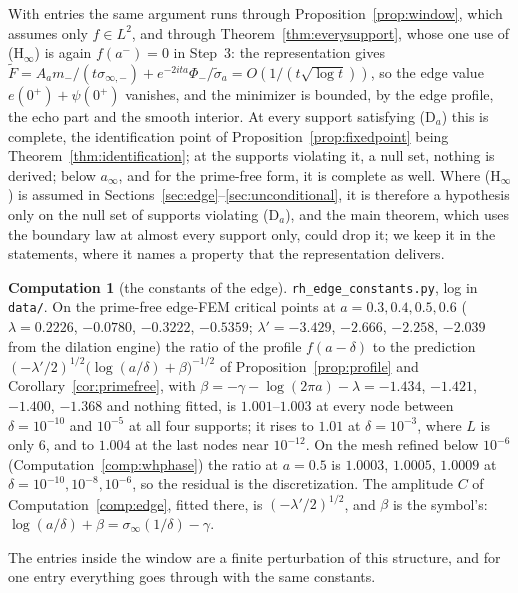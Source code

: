 \documentclass[11pt]{article}
\theoremstyle{definition}
\newtheorem{computation}[theorem]{Computation}
\theoremstyle{remark}
\begin{document}
With entries the same argument runs through Proposition~\ref{prop:window}, which assumes only $f\in L^2$, and through Theorem~\ref{thm:everysupport}, whose one use of (H$_\infty$) is again $f(a^-)=0$ in Step~3: the representation gives $\tilde F=A_am_-/(t\sigma_{\infty,-})+e^{-2ita}\Phi_-/\tilde\sigma_a=O(1/(t\sqrt{\log t}))$, so the edge value $e(0^+)+\psi(0^+)$ vanishes, and the minimizer is bounded, by the edge profile, the echo part and the smooth interior. At every support satisfying (D$_a$) this is complete, the identification point of Proposition~\ref{prop:fixedpoint} being Theorem~\ref{thm:identification}; at the supports violating it, a null set, nothing is derived; below $a_\infty$, and for the prime-free form, it is complete as well. Where (H$_\infty$) is assumed in Sections~\ref{sec:edge}--\ref{sec:unconditional}, it is therefore a hypothesis only on the null set of supports violating (D$_a$), and the main theorem, which uses the boundary law at almost every support only, could drop it; we keep it in the statements, where it names a property that the representation delivers.


\begin{computation}[the constants of the edge]\label{comp:edgeconst}
\texttt{rh\_edge\_constants.py}, log in \texttt{data/}. On the prime-free edge-FEM critical points at $a=0.3,0.4,0.5,0.6$ ($\lambda=0.2226$, $-0.0780$, $-0.3222$, $-0.5359$; $\lambda'=-3.429$, $-2.666$, $-2.258$, $-2.039$ from the dilation engine) the ratio of the profile $f(a-\delta)$ to the prediction $(-\lambda'/2)^{1/2}\big(\log(a/\delta)+\beta\big)^{-1/2}$ of Proposition~\ref{prop:profile} and Corollary~\ref{cor:primefree}, with $\beta=-\gamma-\log(2\pi a)-\lambda=-1.434$, $-1.421$, $-1.400$, $-1.368$ and nothing fitted, is $1.001$--$1.003$ at every node between $\delta=10^{-10}$ and $10^{-5}$ at all four supports; it rises to $1.01$ at $\delta=10^{-3}$, where $L$ is only $6$, and to $1.004$ at the last nodes near $10^{-12}$. On the mesh refined below $10^{-6}$ (Computation~\ref{comp:whphase}) the ratio at $a=0.5$ is $1.0003$, $1.0005$, $1.0009$ at $\delta=10^{-10},10^{-8},10^{-6}$, so the residual is the discretization. The amplitude $C$ of Computation~\ref{comp:edge}, fitted there, is $(-\lambda'/2)^{1/2}$, and $\beta$ is the symbol's: $\log(a/\delta)+\beta=\sigma_\infty(1/\delta)-\gamma$.
\end{computation}

The entries inside the window are a finite perturbation of this structure, and for one entry everything goes through with the same constants.
\end{document}
